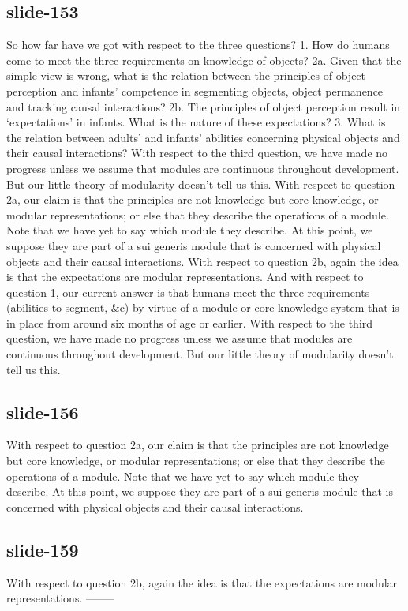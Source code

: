 \documentclass[12pt,\papersize]{extarticle}
\begin{document}
\subsection{slide-153}
So how far have we got with respect to the three questions?
1. How do humans come to meet the three requirements on knowledge of objects? 2a. Given that the simple view is wrong, what is the relation between the principles of object perception and infants’ competence in segmenting objects, object permanence and tracking causal interactions? 2b. The principles of object perception result in ‘expectations’ in infants. What is the nature of these expectations? 3. What is the relation between adults’ and infants’ abilities concerning physical objects and their causal interactions? With respect to the third question, we have made no progress unless we assume that modules are continuous throughout development. But our little theory of modularity doesn't tell us this. With respect to question 2a, our claim is that the principles are not knowledge but core knowledge, or modular representations; or else that they describe the operations of a module. Note that we have yet to say which module they describe. At this point, we suppose they are part of a sui generis module that is concerned with physical objects and their causal interactions. With respect to question 2b, again the idea is that the expectations are modular representations. And with respect to question 1, our current answer is that humans meet the three requirements (abilities to segment, \&c) by virtue of a module or core knowledge system that is in place from around six months of age or earlier.
With respect to the third question, we have made no progress unless we assume that modules are continuous throughout development. But our little theory of modularity doesn't tell us this.
 
 
\subsection{slide-156}
With respect to question 2a, our claim is that the principles are not knowledge but core knowledge, or modular representations; or else that they describe the operations of a module.
Note that we have yet to say which module they describe.
At this point, we suppose they are part of a sui generis module that is concerned with physical objects and their causal interactions.
 
 
\subsection{slide-159}
With respect to question 2b, again the idea is that the expectations are modular representations.
--------
 
\end{document}
